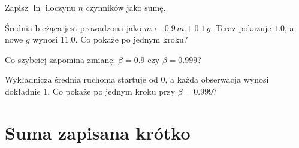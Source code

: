 \begin{quiz}
\item Zapisz $\ln$ iloczynu $n$ czynników jako sumę. 
\item Średnia bieżąca jest prowadzona jako
  $m \leftarrow \num{0.9}\,m + \num{0.1}\,g$. Teraz pokazuje $\num{1.0}$, a
  nowe $g$ wynosi $\num{11.0}$. Co pokaże po jednym kroku? 
\item Co szybciej zapomina zmianę: $\beta = \num{0.9}$ czy
  $\beta = \num{0.999}$? 
\item Wykładnicza średnia ruchoma startuje od $0$, a każda obserwacja wynosi
  dokładnie $1$. Co pokaże po jednym kroku przy $\beta = \num{0.999}$?
\end{quiz}

\section{Suma zapisana krótko}
\label{sec:F04-sigma}

